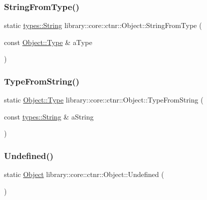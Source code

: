 \subsubsection{\texorpdfstring{String\+From\+Type()}{StringFromType()}}
{\footnotesize\ttfamily static \hyperlink{classlibrary_1_1core_1_1types_1_1_string}{types\+::\+String} library\+::core\+::ctnr\+::\+Object\+::\+String\+From\+Type (\begin{DoxyParamCaption}\item[{const \hyperlink{classlibrary_1_1core_1_1ctnr_1_1_object_a0766006ad111133d70349019551b31d6}{Object\+::\+Type} \&}]{a\+Type }\end{DoxyParamCaption})\hspace{0.3cm}{\ttfamily [static]}}

\mbox{\label{classlibrary_1_1core_1_1ctnr_1_1_object_ac9ea909125427ebfe1b719596117cf5b}} 
\subsubsection{\texorpdfstring{Type\+From\+String()}{TypeFromString()}}
{\footnotesize\ttfamily static \hyperlink{classlibrary_1_1core_1_1ctnr_1_1_object_a0766006ad111133d70349019551b31d6}{Object\+::\+Type} library\+::core\+::ctnr\+::\+Object\+::\+Type\+From\+String (\begin{DoxyParamCaption}\item[{const \hyperlink{classlibrary_1_1core_1_1types_1_1_string}{types\+::\+String} \&}]{a\+String }\end{DoxyParamCaption})\hspace{0.3cm}{\ttfamily [static]}}

\mbox{\label{classlibrary_1_1core_1_1ctnr_1_1_object_a44ab889938fb505237c87feedd6a6770}} 
\subsubsection{\texorpdfstring{Undefined()}{Undefined()}}
{\footnotesize\ttfamily static \hyperlink{classlibrary_1_1core_1_1ctnr_1_1_object}{Object} library\+::core\+::ctnr\+::\+Object\+::\+Undefined (\begin{DoxyParamCaption}{ }\end{DoxyParamCaption})\hspace{0.3cm}{\ttfamily [static]}}




